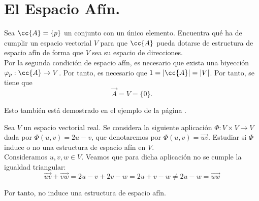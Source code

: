 \section{El Espacio Afín.}\label{Rel:Tema1}


\begin{ejercicio}
    Sea $\cc{A} = \{p\}$ un conjunto con un único elemento. Encuentra qué ha de cumplir un espacio vectorial $V$ para que $\cc{A}$ pueda dotarse de estructura de espacio afín de forma que $V$ sea su espacio de direcciones.\\

    Por la segunda condición de espacio afín, es necesario que exista una biyección $\varphi_p:\cc{A}\to V$. Por tanto, es necesario que $1=|\cc{A}|=|V|$. Por tanto, se tiene que 
    $$\vec{A}=V=\{0\}.$$

    Esto también está demostrado en el ejemplo de la página \pageref{ej:espacio_afin_punto}.
\end{ejercicio}

\begin{ejercicio}
     Sea $V$ un espacio vectorial real. Se considera la siguiente aplicación $\Phi:V\times V \to V$ dada por $\Phi(u, v) = 2u - v$, que denotaremos por $\Phi(u, v) = \vec{uv}$. Estudiar si $\Phi$ induce o no una estructura de espacio afín en $V$.\\

     Consideramos $u,v,w\in V$. Veamos que para dicha aplicación no se cumple la igualdad triangular:
     \begin{equation*}
         \vec{uv} + \vec{vw} = 2u-v+2v-w = 2u+v-w\neq 2u-w=\vec{uw}
     \end{equation*}

     Por tanto, no induce una estructura de espacio afín.
\end{ejercicio}


